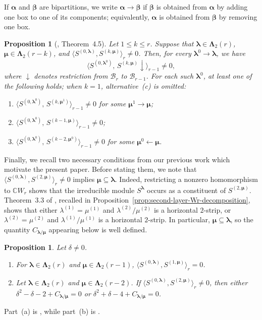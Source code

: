 \documentclass[10pt,a4paper]{amsart}
\newtheorem{proposition}[theorem]{Proposition}
\newcommand{\C}{\mathbb{C}}
\newcommand{\1}{\mathfrak{1}}
\newcommand{\B}{\mathcal{B}}
\begin{document}
If $\bm\alpha$ and $\bm\beta$ are bipartitions, we write $\bm\alpha\to\bm\beta$ if $\bm\beta$ is obtained from $\bm\alpha$ by adding one box to one of its components; equivalently, $\bm\alpha$ is obtained from $\bm\beta$ by removing one box.

\begin{proposition}[\cite{KCTprevious}, Theorem~4.5]
\label{prop:case-split}
Let $1\leq k\leq r$. Suppose that $\bm\lambda\in\bm\Lambda_2(r)$, $\bm\mu\in\bm\Lambda_2(r-k)$, and $\langle S^{(0,\bm\lambda)},S^{(k,\bm\mu)}\rangle_{r}\neq 0$. Then, for every $\bm\lambda^0\to\bm\lambda$, we have
$$
\big\langle S^{(0,\bm\lambda^0)},\,S^{(k,\bm\mu)}\!\downarrow\big\rangle_{r-1}\neq 0,
$$
where $\downarrow$ denotes restriction from $\B_r$ to $\B_{r-1}$. For each such $\bm\lambda^0$, at least one of the following holds; when $k=1$, alternative~(c) is omitted:
\begin{enumerate}
\item $\langle S^{(0,\bm\lambda^0)},\,S^{(k,\bm\mu^1)}\rangle_{r-1}\neq 0$ for some $\bm\mu^1\to\bm\mu$;
\item $\langle S^{(0,\bm\lambda^0)},\,S^{(k-1,\bm\mu)}\rangle_{r-1}\neq 0$;
\item $\langle S^{(0,\bm\lambda^0)},\,S^{(k-2,\bm\mu^0)}\rangle_{r-1}\neq 0$ for some $\bm\mu^0\leftarrow\bm\mu$.
\end{enumerate}
\end{proposition}

Finally, we recall two necessary conditions from our previous
work which motivate the present paper. Before stating them,
we note that
$\langle S^{(0,\bm\lambda)},S^{(2,\bm\mu)}\rangle_r\neq0$
implies $\bm\mu\subseteq\bm\lambda$. Indeed, restricting
a nonzero homomorphism to $\C W_r$ shows that the
irreducible module $S^{\bm\lambda}$ occurs as a constituent
of $S^{(2,\bm\mu)}$. Theorem~3.3 of \cite{KCTprevious},
recalled in
Proposition~\ref{prop:second-layer-Wr-decomposition},
shows that either $\lambda^{(1)}=\mu^{(1)}$ and
$\lambda^{(2)}/\mu^{(2)}$ is a horizontal $2$-strip,
or $\lambda^{(2)}=\mu^{(2)}$ and
$\lambda^{(1)}/\mu^{(1)}$ is a horizontal $2$-strip.
In particular, $\bm\mu\subseteq\bm\lambda$, so the
quantity $C_{\bm\lambda/\bm\mu}$ appearing below is
well defined.

\begin{proposition}\label{prop:known-local-restrictions}
Let $\delta\neq0$.
\begin{enumerate}
\item[(a)] For $\bm\lambda\in\bm\Lambda_2(r)$ and
$\bm\mu\in\bm\Lambda_2(r-1)$, $\langle S^{(0,\bm\lambda)}, S^{(1,\bm\mu)}\rangle_r=0$.
 
\item[(b)] Let $\bm\lambda\in\bm\Lambda_2(r)$ and
$\bm\mu\in\bm\Lambda_2(r-2)$. If $\langle S^{(0,\bm\lambda)}, S^{(2,\bm\mu)}\rangle_r\neq 0$, then either $
 \delta^2-\delta-2+C_{\bm\lambda/\bm\mu}=0$ or $\delta^2+\delta-4+C_{\bm\lambda/\bm\mu}=0$.
\end{enumerate}
\end{proposition}
Part~(a) is \cite[Lemma~5.5]{KCTprevious}, while part~(b) is \cite[Theorem~5.4]{KCTprevious}.
\end{document}
